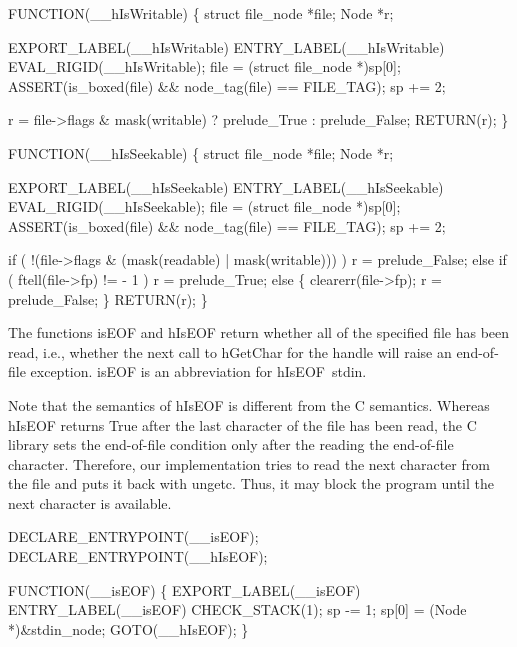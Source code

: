 FUNCTION(__hIsWritable)
\{
    struct file_node *file;
    Node             *r;

    EXPORT_LABEL(__hIsWritable)
 ENTRY_LABEL(__hIsWritable)
    EVAL_RIGID(__hIsWritable);
    file = (struct file_node *)sp[0];
    ASSERT(is_boxed(file) && node_tag(file) == FILE_TAG);
    sp += 2;

    r = file->flags & mask(writable) ? prelude_True : prelude_False;
    RETURN(r);
\}

FUNCTION(__hIsSeekable)
\{
    struct file_node *file;
    Node             *r;

    EXPORT_LABEL(__hIsSeekable)
 ENTRY_LABEL(__hIsSeekable)
    EVAL_RIGID(__hIsSeekable);
    file = (struct file_node *)sp[0];
    ASSERT(is_boxed(file) && node_tag(file) == FILE_TAG);
    sp += 2;

    if ( !(file->flags & (mask(readable) | mask(writable))) )
        r = prelude_False;
    else if ( ftell(file->fp) != - 1 )
        r = prelude_True;
    else
    \{
        clearerr(file->fp);
        r = prelude_False;
    \}
    RETURN(r);
\}

\nwendcode{}\nwdocspar
The functions {\Tt{}isEOF\nwendquote} and {\Tt{}hIsEOF\nwendquote} return whether all of the
specified file has been read, i.e., whether the next call to
{\Tt{}hGetChar\nwendquote} for the handle will raise an end-of-file exception.
{\Tt{}isEOF\nwendquote} is an abbreviation for {\Tt{}hIsEOF\ stdin\nwendquote}.

Note that the semantics of {\Tt{}hIsEOF\nwendquote} is different from the C
semantics. Whereas {\Tt{}hIsEOF\nwendquote} returns {\Tt{}True\nwendquote} after the last
character of the file has been read, the C library sets the
end-of-file condition only after the reading the end-of-file
character. Therefore, our implementation tries to read the next
character from the file and puts it back with {\Tt{}ungetc\nwendquote}. Thus, it may
block the program until the next character is available.

\nwenddocs{}\plusendmoddef\nwstartdeflinemarkup{}\nwenddeflinemarkup
DECLARE_ENTRYPOINT(__isEOF);
DECLARE_ENTRYPOINT(__hIsEOF);

FUNCTION(__isEOF)
\{
    EXPORT_LABEL(__isEOF)
 ENTRY_LABEL(__isEOF)
    CHECK_STACK(1);
    sp   -= 1;
    sp[0] = (Node *)&stdin_node;
    GOTO(__hIsEOF);
\}

